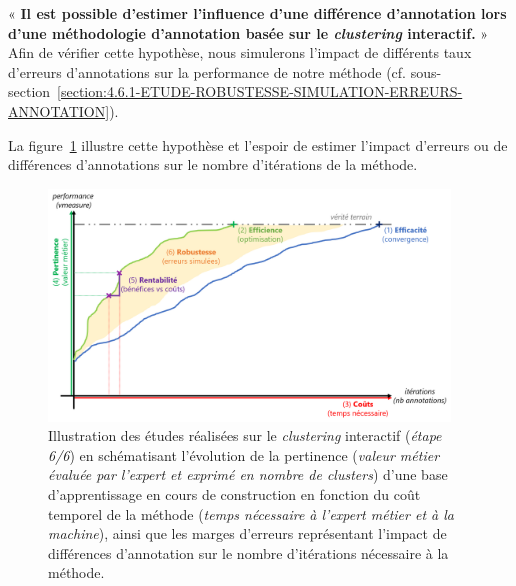 	\begin{tcolorbox}[
		title=\faVial~\textbf{Hypothèse de robustesse}~\faVial,
		colback=colorTcolorboxHypothesis!15,  %
		colframe=colorTcolorboxHypothesis!75,  %
		width=\linewidth
	]
		« \textbf{
			Il est possible d'\textbf{estimer l'influence d'une différence d'annotation} lors d'une méthodologie d'annotation basée sur le \textit{clustering} interactif.
		} » \\
		
		Afin de vérifier cette hypothèse, nous simulerons l'impact de différents taux d'erreurs d'annotations sur la performance de notre méthode (cf. sous-section~\ref{section:4.6.1-ETUDE-ROBUSTESSE-SIMULATION-ERREURS-ANNOTATION}).
		
		La figure~\ref{figure:4.6-HYPOTHESE-ROBUSTESSE} illustre cette hypothèse et l'espoir de estimer l'impact d'erreurs ou de différences d'annotations sur le nombre d'itérations de la méthode.
		\begin{figure}[H]  %
			\centering
			\includegraphics[width=0.95\textwidth]{figures/hypotheses-06-robustesse}
			\caption{Illustration des études réalisées sur le \textit{clustering} interactif (\textit{étape 6/6}) en schématisant l'évolution de la pertinence (\textit{valeur métier évaluée par l'expert et exprimé en nombre de clusters}) d'une base d'apprentissage en cours de construction en fonction du coût temporel de la méthode (\textit{temps nécessaire à l'expert métier et à la machine}), ainsi que les marges d'erreurs représentant l'impact de différences d'annotation sur le nombre d'itérations nécessaire à la méthode.}
			\label{figure:4.6-HYPOTHESE-ROBUSTESSE}
		\end{figure}

	\end{tcolorbox}
	
